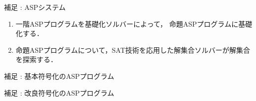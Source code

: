 \documentclass[dvipdfmx,11pt]{beamer}
\begin{document}
\begin{frame}{補足 : ASPシステム}
 
 \vspace{-0.5cm}

 \begin{figure}[htbp]
  \centering
  
 \end{figure}

 \vspace{-0.5cm}

 \begin{exampleblock}{}
  \begin{enumerate}
   \item 一階ASPプログラムを基礎化ソルバーによって，
		 命題ASPプログラムに\alert{基礎化}する．
   \item 命題ASPプログラムについて，SAT技術を応用した解集合ソルバーが解集合を探索する．
  \end{enumerate}
 \end{exampleblock}

\end{frame}


\begin{frame}[fragile]{補足 : 基本符号化のASPプログラム}
 \begin{exampleblock}{}
  \begin{center}
   
  \end{center}
 \end{exampleblock}
\end{frame}

\begin{frame}[fragile]{補足 : 改良符号化のASPプログラム}

 \begin{exampleblock}{}
  \begin{center}
   
  \end{center}
 \end{exampleblock}

\end{frame}
\end{document}
